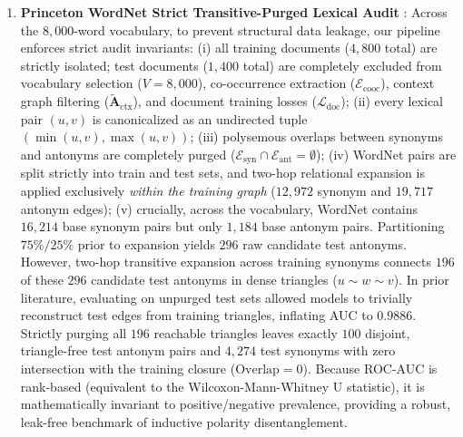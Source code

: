 \documentclass[journal]{IEEEtran}
\begin{document}
\begin{enumerate}
    \item \textbf{Princeton WordNet Strict Transitive-Purged Lexical Audit} \cite{miller1995wordnet}: Across the $8,000$-word vocabulary, to prevent structural data leakage, our pipeline enforces strict audit invariants: (i) all training documents ($4,800$ total) are strictly isolated; test documents ($1,400$ total) are completely excluded from vocabulary selection ($V=8,000$), co-occurrence extraction ($\mathcal{E}_{\text{cooc}}$), context graph filtering ($\tilde{\mathbf{A}}_{\text{ctx}}$), and document training losses ($\mathcal{L}_{\text{doc}}$); (ii) every lexical pair $(u, v)$ is canonicalized as an undirected tuple $(\min(u, v), \max(u, v))$; (iii) polysemous overlaps between synonyms and antonyms are completely purged ($\mathcal{E}_{\text{syn}} \cap \mathcal{E}_{\text{ant}} = \emptyset$); (iv) WordNet pairs are split strictly into train and test sets, and two-hop relational expansion is applied exclusively \textit{within the training graph} ($12,972$ synonym and $19,717$ antonym edges); (v) crucially, across the vocabulary, WordNet contains $16,214$ base synonym pairs but only $1,184$ base antonym pairs. Partitioning $75\%/25\%$ prior to expansion yields $296$ raw candidate test antonyms. However, two-hop transitive expansion across training synonyms connects $196$ of these $296$ candidate test antonyms in dense triangles ($u \sim w \sim v$). In prior literature, evaluating on unpurged test sets allowed models to trivially reconstruct test edges from training triangles, inflating AUC to $0.9886$. Strictly purging all $196$ reachable triangles leaves exactly $100$ disjoint, triangle-free test antonym pairs and $4,274$ test synonyms with zero intersection with the training closure ($\text{Overlap} = 0$). Because ROC-AUC is rank-based (equivalent to the Wilcoxon-Mann-Whitney U statistic), it is mathematically invariant to positive/negative prevalence, providing a robust, leak-free benchmark of inductive polarity disentanglement.
\end{enumerate}
\end{document}
